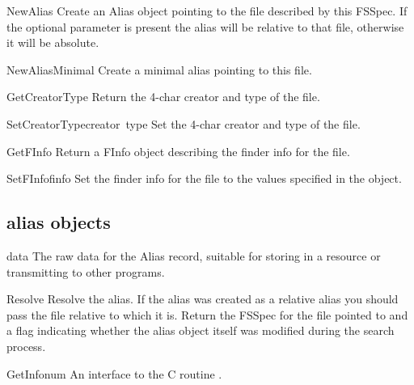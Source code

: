 \begin{funcdesc}{NewAlias}{}
Create an Alias object pointing to the file described by this
FSSpec. If the optional  parameter is present the alias
will be relative to that file, otherwise it will be absolute.
\end{funcdesc}

\begin{funcdesc}{NewAliasMinimal}{}
Create a minimal alias pointing to this file.
\end{funcdesc}

\begin{funcdesc}{GetCreatorType}{}
Return the 4-char creator and type of the file.
\end{funcdesc}

\begin{funcdesc}{SetCreatorType}{creator\, type}
Set the 4-char creator and type of the file.
\end{funcdesc}

\begin{funcdesc}{GetFInfo}{}
Return a FInfo object describing the finder info for the file.
\end{funcdesc}

\begin{funcdesc}{SetFInfo}{finfo}
Set the finder info for the file to the values specified in the
 object.
\end{funcdesc}

\subsection{alias objects}

\renewcommand{\indexsubitem}{(alias object attribute)}
\begin{datadesc}{data}
The raw data for the Alias record, suitable for storing in a resource
or transmitting to other programs.
\end{datadesc}

\renewcommand{\indexsubitem}{(alias object method)}
\begin{funcdesc}{Resolve}{}
Resolve the alias. If the alias was created as a relative alias you
should pass the file relative to which it is. Return the FSSpec for
the file pointed to and a flag indicating whether the alias object
itself was modified during the search process. 
\end{funcdesc}

\begin{funcdesc}{GetInfo}{num}
An interface to the C routine .
\end{funcdesc}


